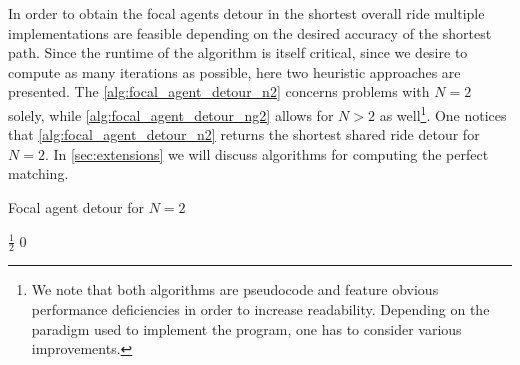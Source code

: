 \documentclass[aps,pra,showpacs,preprintnumbers,amsmath,amssymb,nofootinbib]{revtex4-2}
\begin{document}
    In order to obtain the focal agents detour in the shortest overall ride multiple implementations are feasible depending on the desired accuracy of the shortest path.
    Since the runtime of the algorithm is itself critical, since we desire to compute as many iterations as possible, here two heuristic approaches are presented.
    The \cref{alg:focal_agent_detour_n2} concerns problems with $N = 2$ solely, while \cref{alg:focal_agent_detour_ng2} allows for $N > 2$ as well\footnote{We note that both algorithms are pseudocode and feature obvious performance deficiencies in order to increase readability. Depending on the paradigm used to implement the program, one has to consider various improvements.}.
    One notices that \cref{alg:focal_agent_detour_n2} returns the shortest shared ride detour for $N = 2$. 
    In \cref{sec:extensions} we will discuss algorithms for computing the perfect matching.
    \begin{algorithm}[H]
        \caption{Focal agent detour for $N = 2$}
        \label{alg:focal_agent_detour_n2}   
             
        \begin{algorithmic}[1]
                    \State \Return $\frac{1}{2}$  
                \EndIf
                \State \Return $0$
            \EndProcedure
        \end{algorithmic}
    \end{algorithm}
\end{document}
